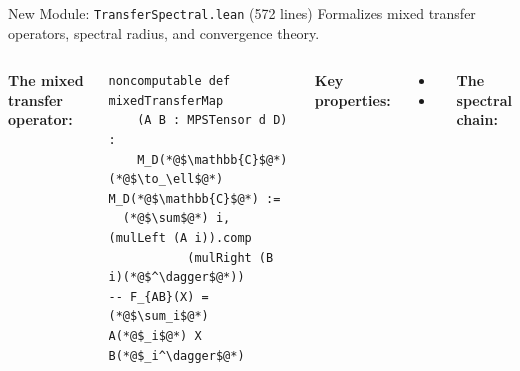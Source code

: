 \documentclass[aspectratio=169,10pt]{beamer}
\begin{document}
\begin{frame}[fragile]{New Module: \texttt{TransferSpectral.lean} (572 lines)}
\vspace{-0.5em}
{\small Formalizes mixed transfer operators, spectral radius, and convergence theory.}

\vspace{0.2em}
\begin{columns}[T]
\textbf{The mixed transfer operator:}
\begin{lstlisting}[basicstyle=\ttfamily\fontsize{5.5}{7}\selectfont\color{white}]
noncomputable def mixedTransferMap
    (A B : MPSTensor d D) :
    M_D(*@$\mathbb{C}$@*) (*@$\to_\ell$@*) M_D(*@$\mathbb{C}$@*) :=
  (*@$\sum$@*) i, (mulLeft (A i)).comp
           (mulRight (B i)(*@$^\dagger$@*))
-- F_{AB}(X) = (*@$\sum_i$@*) A(*@$_i$@*) X B(*@$_i^\dagger$@*)
\end{lstlisting}

\vspace{0.2em}
\textbf{Key properties:}
\begin{itemize}\itemsep0.05em
  \item {\small {}}
  \item {\small {}}
\end{itemize}

\textbf{The spectral chain:}


\end{columns}
\end{frame}
\end{document}
